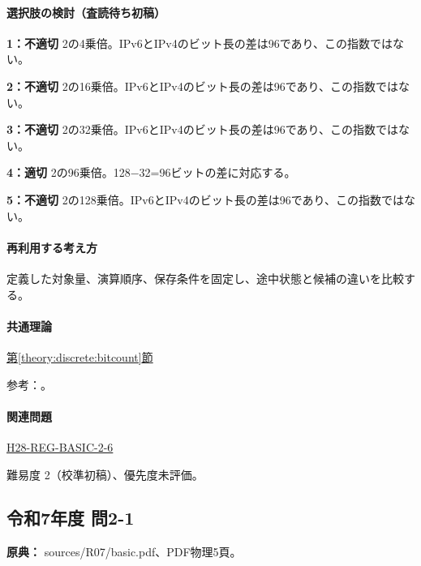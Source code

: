 \paragraph{選択肢の検討（査読待ち初稿）}\mbox{}\par

\noindent\textbf{1：不適切} 2の4乗倍。IPv6とIPv4のビット長の差は96であり、この指数ではない。\par

\noindent\textbf{2：不適切} 2の16乗倍。IPv6とIPv4のビット長の差は96であり、この指数ではない。\par

\noindent\textbf{3：不適切} 2の32乗倍。IPv6とIPv4のビット長の差は96であり、この指数ではない。\par

\noindent\textbf{4：適切} 2の96乗倍。128−32=\allowbreak{}96ビットの差に対応する。\par

\noindent\textbf{5：不適切} 2の128乗倍。IPv6とIPv4のビット長の差は96であり、この指数ではない。\par

\paragraph{再利用する考え方} 定義した対象量、演算順序、保存条件を固定し、途中状態と候補の違いを比較する。

\paragraph{共通理論} \hyperref[theory:discrete:bitcount]{第\ref*{theory:discrete:bitcount}節}

\par 参考：\cite{rfc4291_addresses}。

\paragraph{関連問題} \hyperref[q:h28-reg-basic-2-6]{H28-REG-BASIC-2-6}

\par 難易度 2（校準初稿）、優先度未評価。

\subsection{令和7年度 問2-1}
\label{q:r07-reg-basic-2-1}

\noindent\textbf{原典：} sources/R07/basic.pdf、PDF物理5頁。


